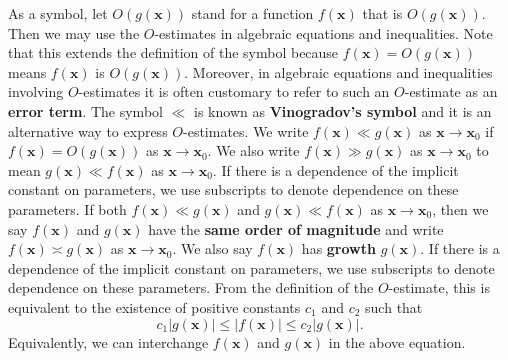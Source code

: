       As a symbol, let $O(g(\mathbf{x}))$ stand for a function $f(\mathbf{x})$ that is $O(g(\mathbf{x}))$. Then we may use the $O$-estimates in algebraic equations and inequalities. Note that this extends the definition of the symbol because $f(\mathbf{x}) = O(g(\mathbf{x}))$ means $f(\mathbf{x})$ is $O(g(\mathbf{x}))$. Moreover, in algebraic equations and inequalities involving $O$-estimates it is often customary to refer to such an $O$-estimate as an \textbf{error term}. The symbol $\ll$ is known as \textbf{Vinogradov's symbol} and it is an alternative way to express $O$-estimates. We write $f(\mathbf{x}) \ll g(\mathbf{x})$ as $\mathbf{x} \to \mathbf{x}_{0}$ if $f(\mathbf{x}) = O(g(\mathbf{x}))$ as $\mathbf{x} \to \mathbf{x}_{0}$. We also write $f(\mathbf{x}) \gg g(\mathbf{x})$ as $\mathbf{x} \to \mathbf{x}_{0}$ to mean $g(\mathbf{x}) \ll f(\mathbf{x})$ as $\mathbf{x} \to \mathbf{x}_{0}$. If there is a dependence of the implicit constant on parameters, we use subscripts to denote dependence on these parameters. If both $f(\mathbf{x}) \ll g(\mathbf{x})$ and $g(\mathbf{x}) \ll f(\mathbf{x})$ as $\mathbf{x} \to \mathbf{x}_{0}$, then we say $f(\mathbf{x})$ and $g(\mathbf{x})$ have the \textbf{same order of magnitude} and write $f(\mathbf{x}) \asymp g(\mathbf{x})$ as $\mathbf{x} \to \mathbf{x}_{0}$. We also say $f(\mathbf{x})$ has \textbf{growth} $g(\mathbf{x})$. If there is a dependence of the implicit constant on parameters, we use subscripts to denote dependence on these parameters. From the definition of the $O$-estimate, this is equivalent to the existence of positive constants $c_{1}$ and $c_{2}$ such that
      \[
        c_{1}|g(\mathbf{x})| \le |f(\mathbf{x})| \le c_{2}|g(\mathbf{x})|.
      \]
      Equivalently, we can interchange $f(\mathbf{x})$ and $g(\mathbf{x})$ in the above equation.
